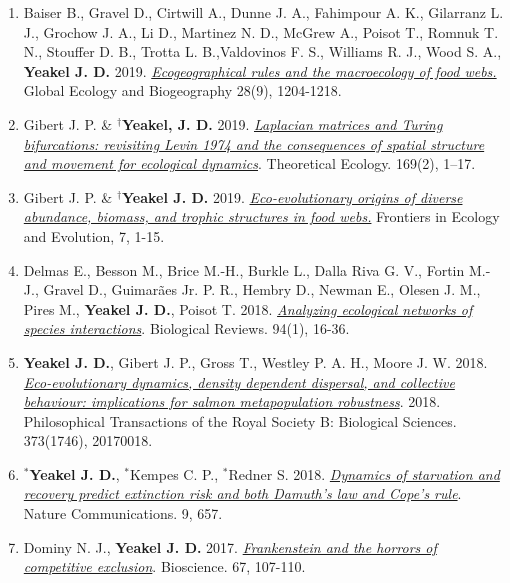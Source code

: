 \documentclass[margin,line,12pt]{res}
\begin{document}
\begin{resume}
\begin{enumerate}
\item Baiser B., Gravel D., Cirtwill A., Dunne J. A., Fahimpour A. K., Gilarranz L. J., Grochow J. A., Li D., Martinez N. D., McGrew A., Poisot T., Romnuk T. N., Stouffer D. B., Trotta L. B.,Valdovinos F. S., Williams R. J., Wood S. A., \textbf{Yeakel J. D.} 2019. \href{https://onlinelibrary.wiley.com/doi/abs/10.1111/geb.12925}{\emph{Ecogeographical rules and the macroecology of food webs.}} Global Ecology and Biogeography 28(9), 1204-1218.

\item Gibert J. P. \& \textbf{${}^\dag$Yeakel, J. D.} 2019. \href{https://link.springer.com/article/10.1007/s12080-018-0403-2}{\emph{Laplacian matrices and Turing bifurcations: revisiting Levin 1974 and the consequences of spatial structure and movement for ecological dynamics}}. Theoretical Ecology. 169(2), 1–17.

\item Gibert J. P. \& \textbf{${}^\dag$Yeakel J. D.} 2019. \href{https://www.frontiersin.org/articles/10.3389/fevo.2019.00015/full}{\emph{Eco-evolutionary origins of diverse abundance, biomass, and trophic structures in food webs.}} Frontiers in Ecology and Evolution, 7, 1-15.
  
\item Delmas E., Besson M., Brice M.-H., Burkle L., Dalla Riva G. V., Fortin M.-J., Gravel D., Guimar\~aes Jr. P. R., Hembry D., Newman E., Olesen J. M., Pires M., \textbf{Yeakel J. D.}, Poisot T. 2018. \href{https://onlinelibrary.wiley.com/doi/abs/10.1111/brv.12433}{\emph{Analyzing ecological networks of species interactions}}. Biological Reviews. 94(1), 16-36.

\item \textbf{Yeakel J. D.}, Gibert J. P., Gross T., Westley P. A. H., Moore J. W. 2018. \href{https://royalsocietypublishing.org/doi/10.1098/rstb.2017.0018}{\emph{Eco-evolutionary dynamics, density dependent dispersal, and collective behaviour: implications for salmon metapopulation robustness}}. 2018. Philosophical Transactions of the Royal Society B: Biological Sciences. 373(1746), 20170018.

\item \textbf{${}^\ast$Yeakel J. D.}, ${}^\ast$Kempes C. P., ${}^\ast$Redner S. 2018. \href{https://www.nature.com/articles/s41467-018-02822-y}{\emph{Dynamics of starvation and recovery predict extinction risk and both Damuth's law and Cope's rule}}. Nature Communications. 9, 657.

\item Dominy N. J., \textbf{Yeakel J. D.} 2017. \href{https://academic.oup.com/bioscience/article-pdf/67/2/107/10251235/biw133.pdf}{\emph{Frankenstein and the horrors of competitive exclusion}}. Bioscience. 67, 107-110.


\end{enumerate}
\end{resume}
\end{document}

